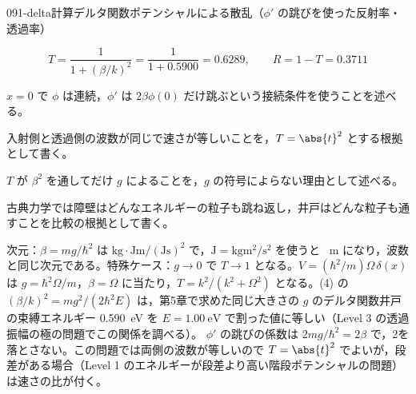 \documentclass[uplatex,dvipdfmx,a4paper,11pt]{jsarticle}
\begin{document}
\begin{mondai}{091-delta}{計算}{デルタ関数ポテンシャルによる散乱（$\phi'$ の跳びを使った反射率・透過率）}
\begin{tadashii}
\[ T=\frac{1}{1+(\beta/k)^{2}}=\frac{1}{1+\num{0.5900}}=\num{0.6289},\qquad R=1-T=\num{0.3711} \]
\begin{ronten}
  \item {} $x=0$ で $\phi$ は連続，$\phi'$ は $2\beta\phi(0)$ だけ跳ぶという接続条件を使うことを述べる。
  \item {} 入射側と透過側の波数が同じで速さが等しいことを，$T=\abs{t}^{2}$ とする根拠として書く。
  \item {} $T$ が $\beta^{2}$ を通してだけ $g$ によることを，$g$ の符号によらない理由として述べる。
  \item {} 古典力学では障壁はどんなエネルギーの粒子も跳ね返し，井戸はどんな粒子も通すことを比較の根拠として書く。
\end{ronten}
\kenzan 次元：$\beta=mg/\hbar^{2}$ は $\unit{\kilogram}\cdot\unit{\joule\metre}/(\unit{\joule\second})^{2}$ で，$\unit{\joule}=\unit{\kilogram\metre\squared\per\second\squared}$ を使うと \unit{\per\metre} になり，波数と同じ次元である。特殊ケース：$g\to 0$ で $T\to 1$ となる。$V=(\hbar^{2}/m)\Omega\,\delta(x)$ は $g=\hbar^{2}\Omega/m$，$\beta=\Omega$ に当たり，$T=k^{2}/(k^{2}+\Omega^{2})$ となる。(4) の $(\beta/k)^{2}=mg^{2}/(2\hbar^{2}E)$ は，第5章で求めた同じ大きさの $g$ のデルタ関数井戸の束縛エネルギー \qty{0.590}{\electronvolt} を $E=\qty{1.00}{\electronvolt}$ で割った値に等しい（Level 3 の透過振幅の極の問題でこの関係を調べる）。
\tsumazuki $\phi'$ の跳びの係数は $2mg/\hbar^{2}=2\beta$ で，2を落とさない。この問題では両側の波数が等しいので $T=\abs{t}^{2}$ でよいが，段差がある場合（Level 1 のエネルギーが段差より高い階段ポテンシャルの問題）は速さの比が付く。
\end{tadashii}
\end{mondai}
\end{document}
